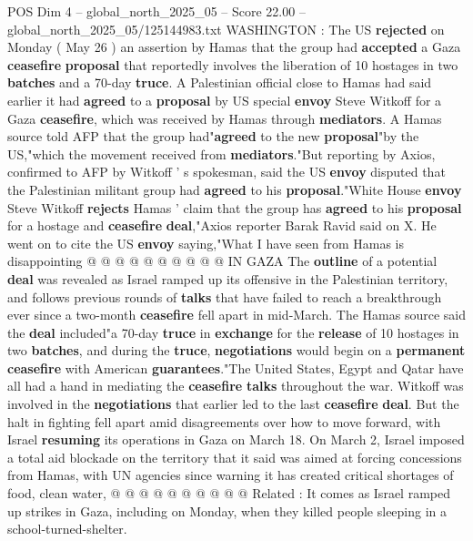 \begin{textsample}{POS Dim 4 – global\_north\_2025\_05 – Score 22.00 – global\_north\_2025\_05/125144983.txt}  \label{ex:f4_pos_219}
WASHINGTON : The US \textbf{rejected} on Monday ( May 26 ) an assertion by Hamas that the group had \textbf{accepted} a Gaza \textbf{ceasefire} \textbf{proposal} that reportedly involves the liberation of 10 hostages in two \textbf{batches} and a 70-day \textbf{truce}.
A Palestinian official close to Hamas had said earlier it had \textbf{agreed} to a \textbf{proposal} by US special \textbf{envoy} Steve Witkoff for a Gaza \textbf{ceasefire}, which was received by Hamas through \textbf{mediators}.
A Hamas source told AFP that the group had"\textbf{agreed} to the new \textbf{proposal}"by the US,"which the movement received from \textbf{mediators}."But reporting by Axios, confirmed to AFP by Witkoff ' s spokesman, said the US \textbf{envoy} disputed that the Palestinian militant group had \textbf{agreed} to his \textbf{proposal}."White House \textbf{envoy} Steve Witkoff \textbf{rejects} Hamas ' claim that the group has \textbf{agreed} to his \textbf{proposal} for a hostage and \textbf{ceasefire} \textbf{deal},"Axios reporter Barak Ravid said on X.
He went on to cite the US \textbf{envoy} saying,"What I have seen from Hamas is disappointing @ @ @ @ @ @ @ @ @ @ IN GAZA The \textbf{outline} of a potential \textbf{deal} was revealed as Israel ramped up its offensive in the Palestinian territory, and follows previous rounds of \textbf{talks} that have failed to reach a breakthrough ever since a two-month \textbf{ceasefire} fell apart in mid-March.
The Hamas source said the \textbf{deal} included"a 70-day \textbf{truce} in \textbf{exchange} for the \textbf{release} of 10 hostages in two \textbf{batches}, and during the \textbf{truce}, \textbf{negotiations} would begin on a \textbf{permanent} \textbf{ceasefire} with American \textbf{guarantees}."The United States, Egypt and Qatar have all had a hand in mediating the \textbf{ceasefire} \textbf{talks} throughout the war.
Witkoff was involved in the \textbf{negotiations} that earlier led to the last \textbf{ceasefire} \textbf{deal}.
But the halt in fighting fell apart amid disagreements over how to move forward, with Israel \textbf{resuming} its operations in Gaza on March 18.
On March 2, Israel imposed a total aid blockade on the territory that it said was aimed at forcing concessions from Hamas, with UN agencies since warning it has created critical shortages of food, clean water, @ @ @ @ @ @ @ @ @ @ Related : It comes as Israel ramped up strikes in Gaza, including on Monday, when they killed people sleeping in a school-turned-shelter.

\end{textsample}
